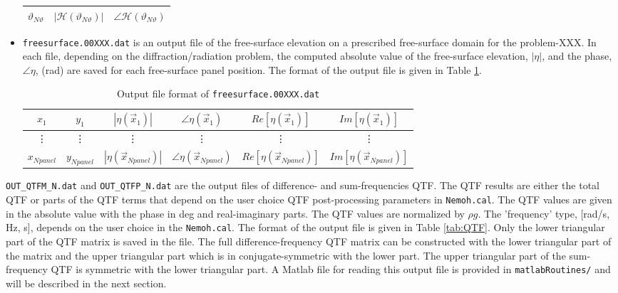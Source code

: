 \documentclass[12pt,a4paper,titlepage]{article}
\begin{document}
\begin{itemize}
\begin{table}[ht]
\begin{center}
\begin{tabular}{ccc}
$\vartheta_{N\vartheta}$ &$|\mathcal{H}(\vartheta_{N\vartheta})|$ & $\angle \mathcal{H}(\vartheta_{N\vartheta})$\\
\hline
\end{tabular}
\end{center}
\end{table}
    \item \texttt{freesurface.00XXX.dat} is an output file of the free-surface elevation on a prescribed free-surface domain for the problem-XXX. In each file, depending on the diffraction/radiation problem, the computed absolute value of the free-surface elevation, $|\eta|$, and the phase, $\angle \eta$, (rad) are saved for each free-surface panel position. The format of the output file is given in Table \ref{tab:freesurface}.
\begin{table}[ht]
\begin{center}
\caption{Output file format of \texttt{freesurface.00XXX.dat}}\label{tab:freesurface}
\begin{tabular}{cccccc}
\hline
$x_1$ &$y_1$ &$|\eta(\vec{x}_1)|$ & $\angle \eta(\vec{x}_1)$ &$Re[ \eta(\vec{x}_1)]$ &$Im[ \eta(\vec{x}_1)]$\\
\hline
\vdots &\vdots &\vdots &\vdots &\vdots &\vdots
\\
\hline
$x_{Npanel}$ &$y_{Npanel}$ &$|\eta(\vec{x}_{Npanel})|$ & $\angle \eta(\vec{x}_{Npanel})$ &$Re[ \eta(\vec{x}_{Npanel})]$ &$Im[ \eta(\vec{x}_{Npanel})]$\\
\hline
\end{tabular}
\end{center}
\end{table}

\end{itemize}


\noindent
\texttt{OUT\_QTFM\_N.dat} and \texttt{OUT\_QTFP\_N.dat} are the output files of difference- and sum-frequencies QTF. The QTF results are either the total QTF or parts of the QTF terms that depend on the user choice QTF post-processing parameters in \texttt{Nemoh.cal}. The QTF values are given in the absolute value with the phase in deg and real-imaginary parts. The QTF values are normalized by $\rho g$. The 'frequency' type, [rad/s, Hz, s], depends on the user choice in the \texttt{Nemoh.cal}. The format of the output file is given in Table \ref{tab:QTF}. Only the lower triangular part of the QTF matrix is saved in the file. The full difference-frequency QTF matrix can be constructed with the lower triangular part of the matrix and the upper triangular part which is in conjugate-symmetric with the lower part. The upper triangular part of the sum-frequency QTF is symmetric with the lower triangular part.  A Matlab file for reading this output file is provided in \texttt{matlabRoutines/} and will be described in the next section.
\end{document}
